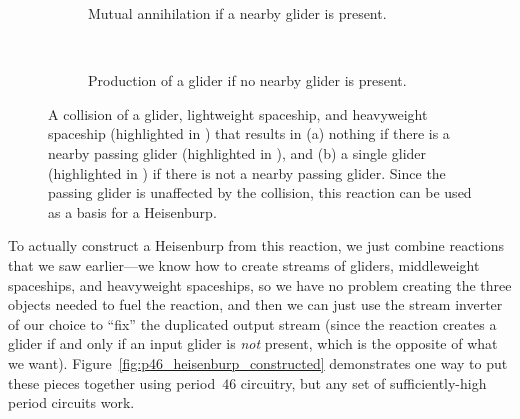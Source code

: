 \begin{figure}[!htb]
	\centering
	\begin{subfigure}{.47\textwidth}
		\centering
		\caption{Mutual annihilation if a nearby glider is present.}
		\label{fig:heisenburp_reaction_p35_0}
	\end{subfigure} \ \ \ \ %
	\begin{subfigure}{.5\textwidth}
		\centering
		\caption{Production of a glider if no nearby glider is present.}
		\label{fig:heisenburp_reaction_p35_1}
	\end{subfigure}
	\caption{A collision of a glider, lightweight spaceship, and heavyweight spaceship (highlighted in ) that results in (a) nothing if there is a nearby passing glider (highlighted in ), and (b) a single glider (highlighted in ) if there is not a nearby passing glider. Since the passing glider is unaffected by the collision, this reaction can be used as a basis for a Heisenburp.}\label{fig:heisenburp_reaction_p35}
\end{figure}

To actually construct a Heisenburp from this reaction, we just combine reactions that we saw earlier---we know how to create streams of gliders, middleweight spaceships, and heavyweight spaceships, so we have no problem creating the three objects needed to fuel the reaction, and then we can just use the stream inverter of our choice to ``fix'' the duplicated output stream (since the reaction creates a glider if and only if an input glider is \emph{not} present, which is the opposite of what we want). Figure~\ref{fig:p46_heisenburp_constructed} demonstrates one way to put these pieces together using period~$46$ circuitry, but any set of sufficiently-high period circuits work.

